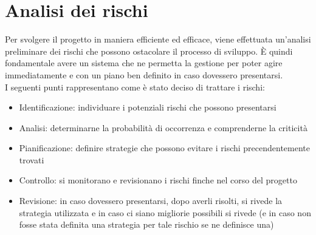 
\newpage
\section{Analisi dei rischi} \label{AnalisiDeiRischi}
	Per svolgere il progetto in maniera efficiente ed efficace, viene effettuata un'analisi preliminare dei rischi che possono ostacolare il processo di sviluppo.
	È quindi fondamentale avere un sistema che ne permetta la gestione per poter agire immediatamente e con un piano ben definito in caso dovessero presentarsi.\\
	I seguenti punti rappresentano come è stato deciso di trattare i rischi:
	\begin{itemize}
		\item Identificazione: individuare i potenziali rischi che possono presentarsi
		\item Analisi: determinarne la probabilità di occorrenza e comprenderne la criticità
		\item Pianificazione: definire strategie che possono evitare i rischi precendentemente trovati
		\item Controllo: si monitorano e revisionano i rischi finche nel corso del progetto
		\item Revisione: in caso dovessero presentarsi, dopo averli risolti, si rivede la strategia utilizzata e in caso ci siano migliorie possibili si rivede (e in caso non fosse stata definita una strategia per tale rischio se ne definisce una)
	\end{itemize}

